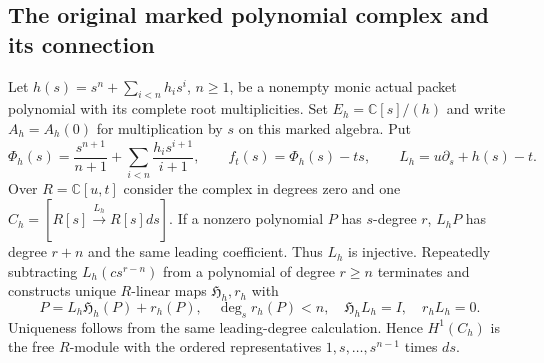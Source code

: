\documentclass[11pt,a4paper]{article}
\theoremstyle{definition}
\begin{document}
\subsection{The original marked polynomial complex and its connection}
Let $h(s)=s^n+\sum_{i<n}h_i s^i$, $n\geq1$, be a nonempty monic actual
packet polynomial with its complete root multiplicities.  Set
$E_h=\mathbb C[s]/(h)$ and write $A_h=A_h(0)$ for multiplication by
$s$ on this marked algebra.  Put
\begin{equation}
 \Phi_h(s)=\frac{s^{n+1}}{n+1}+\sum_{i<n}\frac{h_i s^{i+1}}{i+1},
 \qquad f_t(s)=\Phi_h(s)-ts,\qquad
 L_h=u\partial_s+h(s)-t.                         \tag{IAL1}
\end{equation}
Over $R=\mathbb C[u,t]$ consider the complex in degrees zero and one
$C_h=[R[s]\xrightarrow{L_h}R[s]ds]$.  If a nonzero polynomial $P$ has
$s$-degree $r$, $L_hP$ has degree $r+n$ and the same leading coefficient.
Thus $L_h$ is injective.  Repeatedly subtracting $L_h(c s^{r-n})$ from a
polynomial of degree $r\geq n$ terminates and constructs unique $R$-linear
maps $\mathfrak H_h,r_h$ with
\begin{equation}
 P=L_h\mathfrak H_h(P)+r_h(P),\quad \deg_s r_h(P)<n,
 \quad \mathfrak H_h L_h=I,\quad r_h L_h=0.        \tag{IAL2}
\end{equation}
Uniqueness follows from the same leading-degree calculation.  Hence
$H^1(C_h)$ is the free $R$-module with the ordered representatives
$1,s,\ldots,s^{n-1}$ times $ds$.
\end{document}
